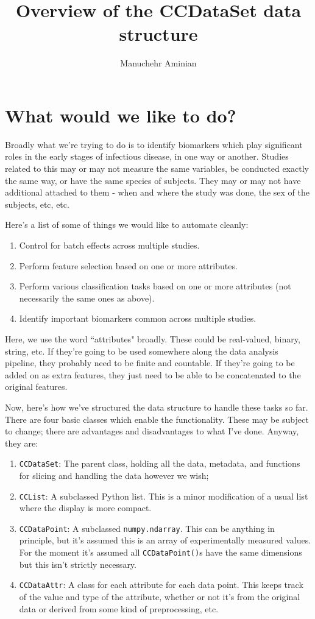 \documentclass{article}
\title{Overview of the CCDataSet data structure}
\author{Manuchehr Aminian}
\newcommand{\ttt}{\texttt}
\begin{document}
\maketitle


\section{What would we like to do?}
Broadly what we're trying to do is to identify biomarkers which play
significant roles in the early stages of infectious disease, in one way
or another. Studies related to this may or may not measure the same
variables, be conducted exactly the same way, or have the same species
of subjects. They may or may not have additional attached to them -
when and where the study was done, the sex of the subjects, etc, etc.

Here's a list of some of things we would like to automate cleanly:
%
\begin{enumerate}
\item Control for batch effects across multiple studies.
\item Perform feature selection based on one or more attributes.
\item Perform various classification tasks based on one or more attributes (not necessarily the same ones as above).
\item Identify important biomarkers common across multiple studies.
\end{enumerate}
%

Here, we use the word ``attributes" broadly. These could be
real-valued, binary, string, etc. If they're going to be used somewhere
along the data analysis pipeline, they probably need to be
finite and countable. If they're going to be added on as extra features,
they just need to be able to be concatenated to the original features.
%

Now, here's how we've structured the data structure to handle these tasks
so far. There are four basic classes which enable the functionality.
These may be subject to change; there are advantages and disadvantages to
what I've done. Anyway, they are:
%
\begin{enumerate}
\item \texttt{CCDataSet}: The parent class, holding all the data, metadata, and
functions for slicing and handling the data however we wish;
\item \texttt{CCList}: A subclassed Python list. This is a minor modification of
a usual list where the display is more compact.
\item \texttt{CCDataPoint}: A subclassed \ttt{numpy.ndarray}. This can be anything
in principle, but it's assumed this is an array of experimentally measured
values. For the moment it's assumed all \ttt{CCDataPoint()}s have the same dimensions
but this isn't strictly necessary.
\item \texttt{CCDataAttr}: A class for each attribute for each data point.
This keeps track of the value and type of the attribute, whether or not it's
from the original data or derived from some kind of preprocessing, etc.
\end{enumerate}
\end{document}
